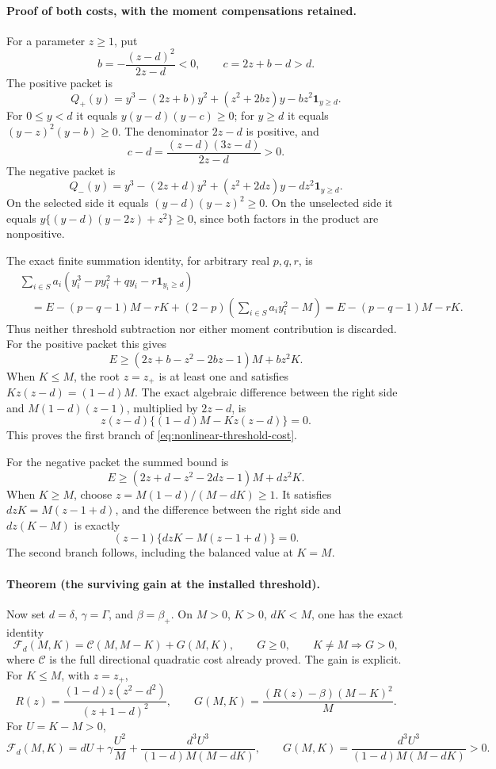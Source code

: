 \paragraph{Proof of both costs, with the moment compensations retained.}
For a parameter \(z\ge1\), put
\[
 b=-\frac{(z-d)^2}{2z-d}<0,\qquad c=2z+b-d>d.
\]
The positive packet is
\[
 Q_+(y)=y^3-(2z+b)y^2+(z^2+2bz)y-bz^2\mathbf1_{y\ge d}.
\]
For \(0\le y<d\) it equals \(y(y-d)(y-c)\ge0\); for \(y\ge d\) it equals
\((y-z)^2(y-b)\ge0\).  The denominator \(2z-d\) is positive, and
\[
 c-d=\frac{(z-d)(3z-d)}{2z-d}>0.
\]
The negative packet is
\[
 Q_-(y)=y^3-(2z+d)y^2+(z^2+2dz)y-dz^2\mathbf1_{y\ge d}.
\]
On the selected side it equals \((y-d)(y-z)^2\ge0\).  On the unselected
side it equals \(y\{(y-d)(y-2z)+z^2\}\ge0\), since both factors in the
product are nonpositive.

The exact finite summation identity, for arbitrary real \(p,q,r\), is
\begin{align*}
 &\sum_{i\in S}a_i
    (y_i^3-py_i^2+qy_i-r\mathbf1_{y_i\ge d})\\
 &\quad=E-(p-q-1)M-rK
      +(2-p)\left(\sum_{i\in S}a_i y_i^2-M\right)
      =E-(p-q-1)M-rK.
\end{align*}
Thus neither threshold subtraction nor either moment contribution is
discarded.  For the positive packet this gives
\[
 E\ge (2z+b-z^2-2bz-1)M+bz^2K.
\]
When \(K\le M\), the root \(z=z_+\) is at least one and satisfies
\(Kz(z-d)=(1-d)M\).  The exact algebraic difference between the right side
and \(M(1-d)(z-1)\), multiplied by \(2z-d\), is
\[
 z(z-d)\{(1-d)M-Kz(z-d)\}=0.
\]
This proves the first branch of \eqref{eq:nonlinear-threshold-cost}.

For the negative packet the summed bound is
\[
 E\ge(2z+d-z^2-2dz-1)M+dz^2K.
\]
When \(K\ge M\), choose \(z=M(1-d)/(M-dK)\ge1\).  It satisfies
\(dzK=M(z-1+d)\), and the difference between the right side and
\(dz(K-M)\) is exactly
\[
 (z-1)\{dzK-M(z-1+d)\}=0.
\]
The second branch follows, including the balanced value at \(K=M\).

\paragraph{Theorem (the surviving gain at the installed threshold).}
Now set \(d=\delta\), \(\gamma=\Gamma\), and \(\beta=\beta_+\).  On
\(M>0\), \(K>0\), \(dK<M\), one has the exact identity
\begin{equation}
 \mathcal F_d(M,K)=\mathcal C(M,M-K)+G(M,K),\qquad G\ge0,
 \qquad K\ne M\Longrightarrow G>0,
 \label{eq:nonlinear-threshold-exact-gain}
\end{equation}
where \(\mathcal C\) is the full directional quadratic cost already proved.
The gain is explicit.  For \(K\le M\), with \(z=z_+\),
\[
 R(z)=\frac{(1-d)z(z^2-d^2)}{(z+1-d)^2},\qquad
 G(M,K)=\frac{(R(z)-\beta)(M-K)^2}{M}.
\]
For \(U=K-M>0\),
\begin{equation}
 \mathcal F_d(M,K)=dU+\gamma\frac{U^2}{M}
   +\frac{d^3U^3}{(1-d)M(M-dK)},\qquad
 G(M,K)=\frac{d^3U^3}{(1-d)M(M-dK)}>0.
 \label{eq:nonlinear-threshold-negative-gain}
\end{equation}

